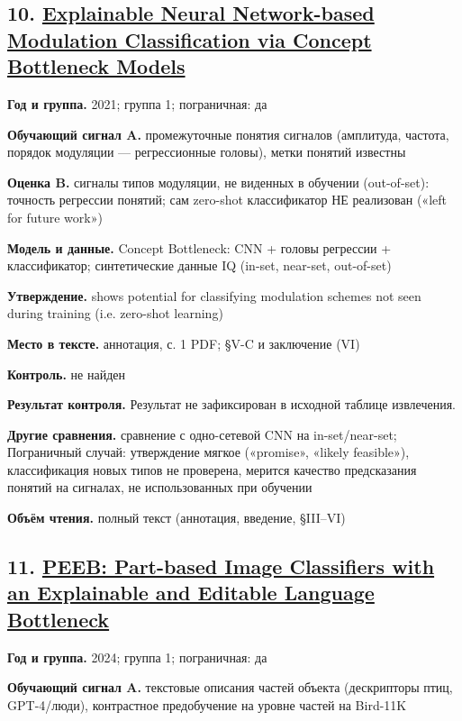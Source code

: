 \subsection*{10. \href{https://doi.org/10.1109/ccwc51732.2021.9376108}{Explainable Neural Network-based Modulation Classification via Concept Bottleneck Models}}

\textbf{Год и группа.} 2021; группа 1; пограничная: да

\textbf{Обучающий сигнал A.} промежуточные понятия сигналов (амплитуда, частота, порядок модуляции — регрессионные головы), метки понятий известны

\textbf{Оценка B.} сигналы типов модуляции, не виденных в обучении (out-of-set): точность регрессии понятий; сам zero-shot классификатор НЕ реализован («left for future work»)

\textbf{Модель и данные.} Concept Bottleneck: CNN + головы регрессии + классификатор; синтетические данные IQ (in-set, near-set, out-of-set)

\textbf{Утверждение.} shows potential for classifying modulation schemes not seen during training (i.e. zero-shot learning)

\textbf{Место в тексте.} аннотация, с. 1 PDF; §V-C и заключение (VI)

\textbf{Контроль.} не найден

\textbf{Результат контроля.} Результат не зафиксирован в исходной таблице извлечения.

\textbf{Другие сравнения.} сравнение с одно-сетевой CNN на in-set/near-set; Пограничный случай: утверждение мягкое («promise», «likely feasible»), классификация новых типов не проверена, мерится качество предсказания понятий на сигналах, не использованных при обучении

\textbf{Объём чтения.} полный текст (аннотация, введение, §III–VI)


\subsection*{11. \href{https://doi.org/10.18653/v1/2024.findings-naacl.131}{PEEB: Part-based Image Classifiers with an Explainable and Editable Language Bottleneck}}

\textbf{Год и группа.} 2024; группа 1; пограничная: да

\textbf{Обучающий сигнал A.} текстовые описания частей объекта (дескрипторы птиц, GPT-4/люди), контрастное предобучение на уровне частей на Bird-11K

